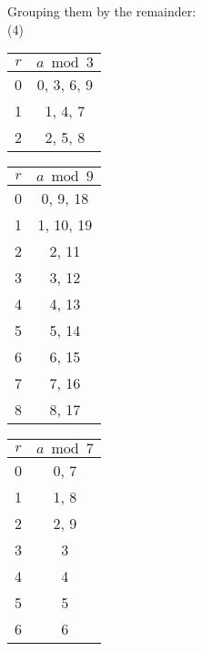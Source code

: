 \noindent
Grouping them by the remainder:\\
(4)
\begin{minipage}{0.32\textwidth}
    \centering
    \begin{tabular}{c|c}
        \rowcolor{OliveGreen!10}$r$ & $a \bmod 3$ \\
        \hline
        0                           & 0, 3, 6, 9  \\
        1                           & 1, 4, 7     \\
        2                           & 2, 5, 8     \\
    \end{tabular}
\end{minipage}%
\begin{minipage}{0.32\textwidth}
    \centering
    \begin{tabular}{c|c}
        \rowcolor{OliveGreen!10}$r$ & $a \bmod 9$ \\
        \hline
        0                           & 0, 9, 18    \\
        1                           & 1, 10, 19   \\
        2                           & 2, 11       \\
        3                           & 3, 12       \\
        4                           & 4, 13       \\
        5                           & 5, 14       \\
        6                           & 6, 15       \\
        7                           & 7, 16       \\
        8                           & 8, 17       \\
    \end{tabular}
\end{minipage}%
\begin{minipage}{0.32\textwidth}
    \centering
    \begin{tabular}{c|c}
        \rowcolor{OliveGreen!10}$r$ & $a \bmod 7$ \\
        \hline
        0                           & 0, 7        \\
        1                           & 1, 8        \\
        2                           & 2, 9        \\
        3                           & 3           \\
        4                           & 4           \\
        5                           & 5           \\
        6                           & 6           \\
    \end{tabular}
\end{minipage}


